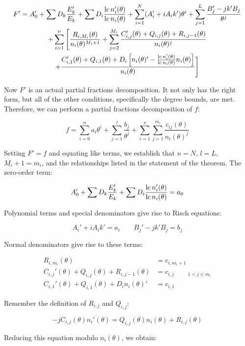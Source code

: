 \begin{multline*}
F' = A_0' + \sum D_k \frac{E_k'}{E_k} + \sum D_i \frac{{\rm lc\,} n_i'(\theta)}{{\rm lc\,} n_i(\theta)} + \sum_{i=1}^N (A_i' + i A_i k' )\theta^i
  + \sum_{j=1}^{L} \frac{B_{j}' - j k' B_{j}}{\theta^j} \\
  + \sum_{i=1}^\nu \Bigg[ \frac{R_{i,M_i}(\theta) }{n_i(\theta)^{M_i+1}}
  + \sum_{j=2}^{M_i} \frac{C_{i,j}'(\theta) + Q_{i,j}(\theta) + R_{i,j-1}(\theta) }{n_i(\theta)^{j}} \\
  + \frac{C_{i,1}'(\theta) + Q_{i,1}(\theta)
  + D_i \left[ n_i(\theta)' - \frac{{\rm lc\,} n_i'(\theta)}{{\rm lc\,} n_i(\theta)} n_i(\theta) \right]}{n_i(\theta)} \Bigg]
\end{multline*}

Now $F'$ is an actual partial fractions decomposition.  It not only has
the right form, but all of the other conditions, specifically
the degree bounds, are met.
Therefore, we can perform
a partial fractions decomposition of $f$:

$$f = \sum_{i=0}^n a_i \theta^i + \sum_{j=1}^{l} \frac{b_{j}}{\theta^j}
+ \sum_{i=1}^\nu \sum_{j=1}^{m_i} \frac{c_{ij}(\theta)}{n_i(\theta)^j}$$

Setting $F' = f$ and equating like terms, we establish that
$n=N$, $l=L$, $M_i+1 = m_i$, and the
relationships listed in the statement of the theorem.  The zero-order term:

$$A_0' + \sum D_k \frac{E_k'}{E_k} + \sum D_i \frac{{\rm lc\,} n_i'(\theta)}{{\rm lc\,} n_i(\theta)} = a_0$$

Polynomial terms
and special denominators give rise to Risch equations:

$$A_i' + i A_i k' = a_i  \qquad  B_{j}' - j k' B_{j} = b_j$$

Normal denominators give rise to these terms:

\begin{align*}
R_{i,m_i}(\theta) & = c_{i,m_i+1} \\
C_{i,j}'(\theta) + Q_{i,j}(\theta) + R_{i,j-1}(\theta) & = c_{i,j} \qquad {}_{1<j\le m_i}\\
C_{i,1}'(\theta) + Q_{i,1}(\theta) + D_i n_i(\theta)' & = c_{i,1}
\end{align*}

Remember the definition of
$R_{i,j}$ and $Q_{i,j}$:

$$-jC_{i,j}(\theta)n_i'(\theta) = Q_{i,j}(\theta) n_i(\theta) + R_{i,j}(\theta)$$

Reducing this equation modulo $n_i(\theta)$, we obtain:

